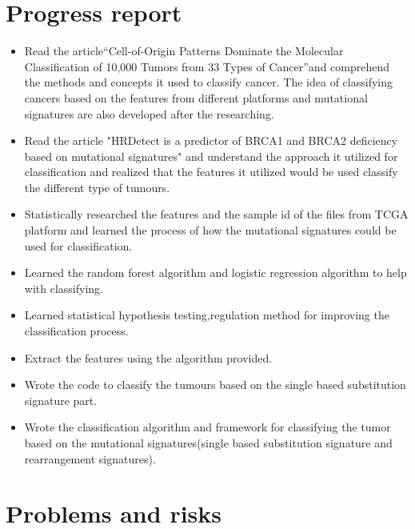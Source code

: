 \documentclass[11pt]{article}
\begin{document}
\newpage
\section{Progress report}\label{progress-report}

\begin{itemize}
\item Read the article“Cell-of-Origin Patterns Dominate the Molecular Classification of 10,000 Tumors from 33 Types of Cancer”and comprehend the methods and concepts it used to classify cancer. The idea of classifying cancers based on the features from different platforms and mutational signatures are also developed after the researching.

\item Read the article "HRDetect is a predictor of BRCA1 and BRCA2 deficiency based on mutational signatures" and understand the approach it utilized for classification and realized that the features it utilized would be used classify the different type of tumours.

\item Statistically researched the features and the sample id of the files from TCGA platform and learned the process of how the mutational signatures could be used for classification.

\item Learned the random forest algorithm and logistic regression algorithm to help with classifying.

\item Learned statistical hypothesis testing,regulation method for improving the classification process.

\item Extract the features using the algorithm provided.

\item Wrote the code to classify the tumours based on the single based substitution signature part.

\item Wrote the classification algorithm and framework for classifying the tumor based on the mutational signatures(single based substitution signature and rearrangement signatures).
\end{itemize}

\section{Problems and risks}\label{problems-and-risks}
\end{document}
